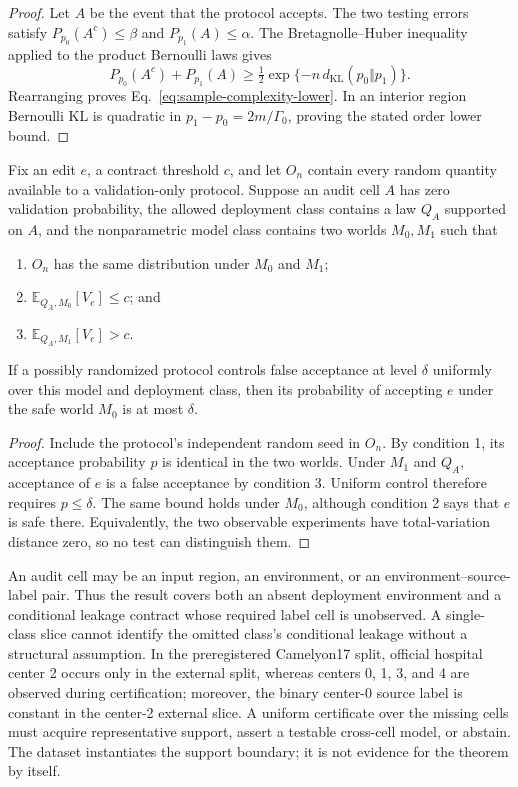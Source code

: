 \begin{proof}
Let $A$ be the event that the protocol accepts. The two testing errors satisfy
$P_{p_0}(A^c)\leq\beta$ and $P_{p_1}(A)\leq\alpha$. The
Bretagnolle--Huber inequality applied to the product Bernoulli laws gives
\begin{equation}
 P_{p_0}(A^c)+P_{p_1}(A)
 \geq\tfrac12\exp\{-n\,d_{\mathrm{KL}}(p_0\Vert p_1)\}.
\end{equation}
Rearranging proves Eq.~\eqref{eq:sample-complexity-lower}. In an interior
region Bernoulli KL is quadratic in $p_1-p_0=2m/\Gamma_0$, proving the stated
order lower bound.
\end{proof}

\begin{theorem}
\label{thm:unsupported}
Fix an edit $e$, a contract threshold $c$, and let $O_n$ contain every random
quantity available to a validation-only protocol. Suppose an audit cell
$A$ has zero validation probability, the allowed deployment class contains a
law $Q_A$ supported on $A$, and the nonparametric model class contains two
worlds $M_0,M_1$ such that
\begin{enumerate}
  \item $O_n$ has the same distribution under $M_0$ and $M_1$;
  \item $\mathbb{E}_{Q_A,M_0}[V_e]\leq c$; and
  \item $\mathbb{E}_{Q_A,M_1}[V_e]>c$.
\end{enumerate}
If a possibly randomized protocol controls false acceptance at level $\delta$
uniformly over this model and deployment class, then its probability of
accepting $e$ under the safe world $M_0$ is at most $\delta$.
\end{theorem}

\begin{proof}
Include the protocol's independent random seed in $O_n$. By condition 1, its
acceptance probability $p$ is identical in the two worlds. Under $M_1$ and
$Q_A$, acceptance of $e$ is a false acceptance by condition 3. Uniform control
therefore requires $p\leq\delta$. The same bound holds under $M_0$, although
condition 2 says that $e$ is safe there. Equivalently, the two observable
experiments have total-variation distance zero, so no test can distinguish
them.
\end{proof}

An audit cell may be an input region, an environment, or an
environment--source-label pair. Thus the result covers both an absent
deployment environment and a conditional leakage contract whose required
label cell is unobserved. A single-class slice cannot identify the omitted
class's conditional leakage without a structural assumption. In the
preregistered Camelyon17 split, official hospital center 2 occurs only in the
external split, whereas centers 0, 1, 3, and 4 are observed during
certification; moreover, the binary center-0 source label is constant in the
center-2 external slice. A uniform certificate over the missing cells must
acquire representative support, assert a testable cross-cell model, or abstain.
The dataset instantiates the support boundary; it is not evidence for the
theorem by itself.
